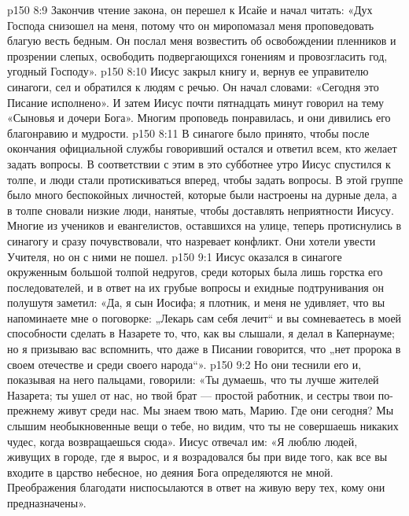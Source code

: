 \vs p150 8:9 Закончив чтение закона, он перешел к Исайе и начал читать: «Дух Господа снизошел на меня, потому что он миропомазал меня проповедовать благую весть бедным. Он послал меня возвестить об освобождении пленников и прозрении слепых, освободить подвергающихся гонениям и провозгласить год, угодный Господу».
\vs p150 8:10 Иисус закрыл книгу и, вернув ее управителю синагоги, сел и обратился к людям с речью. Он начал словами: «Сегодня это Писание исполнено». И затем Иисус почти пятнадцать минут говорил на тему «Сыновья и дочери Бога». Многим проповедь понравилась, и они дивились его благонравию и мудрости.
\vs p150 8:11 В синагоге было принято, чтобы после окончания официальной службы говоривший остался и ответил всем, кто желает задать вопросы. В соответствии с этим в это субботнее утро Иисус спустился к толпе, и люди стали протискиваться вперед, чтобы задать вопросы. В этой группе было много беспокойных личностей, которые были настроены на дурные дела, а в толпе сновали низкие люди, нанятые, чтобы доставлять неприятности Иисусу. Многие из учеников и евангелистов, оставшихся на улице, теперь протиснулись в синагогу и сразу почувствовали, что назревает конфликт. Они хотели увести Учителя, но он с ними не пошел.
\vs p150 9:1 Иисус оказался в синагоге окруженным большой толпой недругов, среди которых была лишь горстка его последователей, и в ответ на их грубые вопросы и ехидные подтрунивания он полушутя заметил: «Да, я сын Иосифа; я плотник, и меня не удивляет, что вы напоминаете мне о поговорке: „Лекарь сам себя лечит“ и вы сомневаетесь в моей способности сделать в Назарете то, что, как вы слышали, я делал в Капернауме; но я призываю вас вспомнить, что даже в Писании говорится, что „нет пророка в своем отечестве и среди своего народа“».
\vs p150 9:2 Но они теснили его и, показывая на него пальцами, говорили: «Ты думаешь, что ты лучше жителей Назарета; ты ушел от нас, но твой брат --- простой работник, и сестры твои по\hyp{}прежнему живут среди нас. Мы знаем твою мать, Марию. Где они сегодня? Мы слышим необыкновенные вещи о тебе, но видим, что ты не совершаешь никаких чудес, когда возвращаешься сюда». Иисус отвечал им: «Я люблю людей, живущих в городе, где я вырос, и я возрадовался бы при виде того, как все вы входите в царство небесное, но деяния Бога определяются не мной. Преображения благодати ниспосылаются в ответ на живую веру тех, кому они предназначены».
